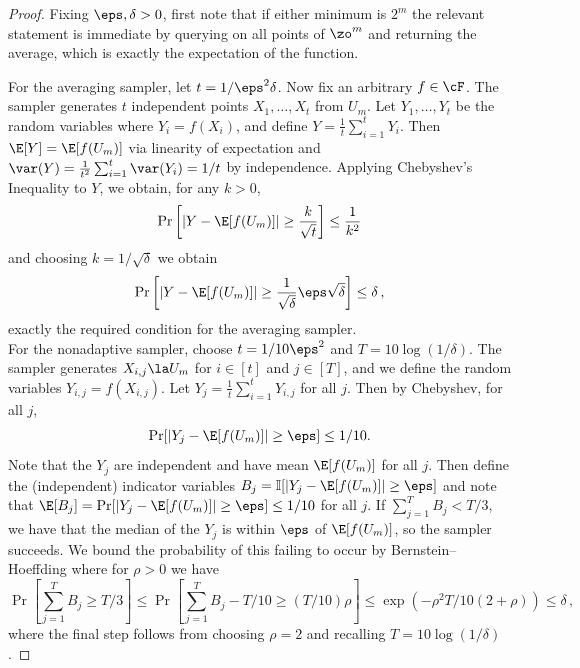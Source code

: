 \documentclass[11pt]{article}
\begin{document}
\begin{proof}
Fixing $\eps,\delta>0$, first note that if either minimum is $2^m$ the relevant statement is immediate by querying on all points of $\zo^m$ and returning the average, which is exactly the expectation of the function.

For the averaging sampler, let $t=1/\eps^2\delta$. Now fix an arbitrary $f\in \cF$. The sampler generates $t$ independent points $X_1,\ldots,X_t$ from $U_m$. Let $Y_1,\ldots,Y_t$ be the random variables where $Y_i=f(X_i)$, and define $Y=\frac{1}{t}\sum_{i=1}^tY_i$. Then $\E[Y]=\E[f(U_m)]$ via linearity of expectation and $\var(Y)=\frac{1}{t^2}\sum_{i=1}^t\var(Y_i)=1/t$ by independence. Applying Chebyshev's Inequality to $Y$, we %
obtain, %
for any $k>0$,
\[\Pr\left[|Y-\E[f(U_m)]| \geq \frac{k}{\sqrt{t}}\right] \leq \frac{1}{k^2}\]
and choosing $k=1/\sqrt{\delta}$ we obtain
\[\Pr\left[|Y-\E[f(U_m)]| \geq \frac{1}{\sqrt{\delta}}\eps\sqrt{\delta}\right] \leq \delta\,,%
\]
%
exactly the required condition for the averaging sampler.\\

For the nonadaptive sampler, choose $t=1/10\eps^2$ and $T=10\log(1/\delta)$. The sampler generates $X_{i,j}\la U_m$ for $i\in[t]$ and $j\in[T]$, and we %
define the random variables $Y_{i,j}=f(X_{i,j})$. Let $Y_j=\frac{1}{t}\sum_{i=1}^tY_{i,j}$ for all $j$. Then by Chebyshev, for all $j$,
\[\Pr[|Y_j-\E[f(U_m)]| \geq \eps] \leq 1/10.\]
Note that the $Y_j$ are independent and have mean $\E[f(U_m)]$ for all $j$. Then define the (independent) indicator variables $B_j=\mathbb{I}[|Y_j-\E[f(U_m)]|\geq \eps]$ and note that $\E[B_j]=\Pr[|Y_j-\E[f(U_m)]|\geq \eps]\leq 1/10$ for all $j$. If $\sum_{j=1}^TB_j<T/3$, we have that the median of the %
$Y_j$  %
is within $\eps$ of $\E[f(U_m)]$, so the sampler succeeds. We bound the probability of this
failing 
to occur by 
%
Bernstein--Hoeffding
%
%
%
%
%
where for $\rho>0$ we have %
\[\Pr\left[\sum_{j=1}^TB_j\geq T/3\right]\leq \Pr\left[\sum_{j=1}^TB_j - T/10 \geq (T/10)\rho\right] \leq \exp(-\rho^2T/10(2+\rho))\leq \delta\,,\] %
%
where  %
the final step follows from choosing $\rho=2$ and recalling $T=10\log(1/\delta)$.
\end{proof}
\end{document}

